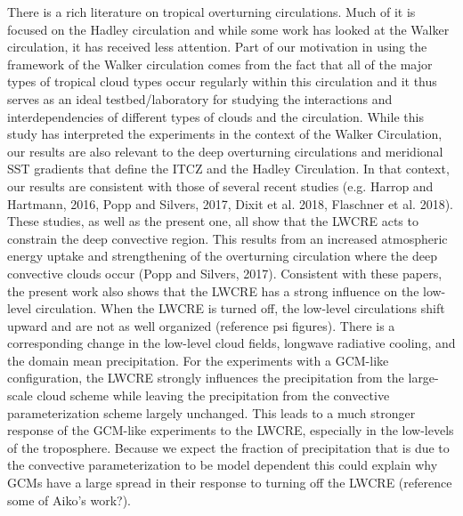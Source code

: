 \documentclass[11pt]{article}   	%
\begin{document}
There is a rich literature on tropical overturning circulations.  Much of it is focused on the Hadley circulation and while some
work has looked at the Walker circulation, it has received less attention.  Part of our motivation in using the framework of the 
Walker circulation comes from the fact that all of the major types of tropical cloud types occur regularly within this circulation
and it thus serves as an ideal testbed/laboratory for studying the interactions and interdependencies of different types of 
clouds and the circulation.  While this study has interpreted the experiments in the context of the Walker Circulation, our results 
are also relevant to the deep overturning circulations and meridional SST gradients that define the ITCZ and the Hadley 
Circulation.  In that context, our results are consistent with those of several recent studies (e.g. Harrop and Hartmann, 2016, 
Popp and Silvers, 2017, Dixit et al. 2018, Flaschner et al. 2018).  These studies, as well as the present one, all show that the 
LWCRE acts to constrain the deep convective region.  This results from an increased atmospheric energy uptake and 
strengthening of the overturning circulation where the deep convective clouds occur (Popp and Silvers, 2017).  Consistent with 
these papers, the present work also shows that the LWCRE has a strong influence on the low-level circulation.   When 
the LWCRE is turned off, the low-level circulations shift upward and are not as well organized (reference psi figures).
There is a corresponding change in the low-level cloud fields, longwave radiative cooling, and the domain mean precipitation.
For the experiments with a GCM-like configuration, the LWCRE strongly influences the precipitation from the large-scale
cloud scheme while leaving the precipitation from the convective parameterization scheme largely unchanged.  This leads 
to a much stronger response of the GCM-like experiments to the LWCRE, especially in the low-levels of the troposphere.  
Because we expect the fraction of precipitation that is due to the convective parameterization to be model dependent 
this could explain why GCMs have a large spread in their response to turning off the LWCRE (reference some 
of Aiko's work?). 
\end{document}
